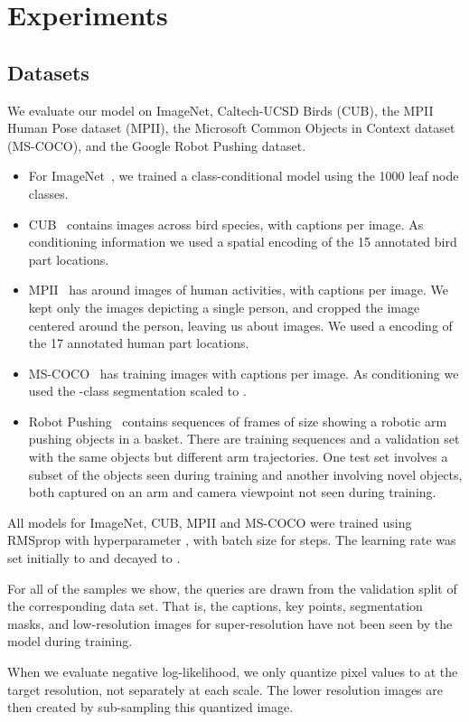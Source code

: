 \documentclass{article}
\begin{document}
\section{Experiments}
\label{sec:experiments}
\subsection{Datasets}
We evaluate our model on ImageNet, Caltech-UCSD Birds (CUB), the MPII Human Pose dataset (MPII), the Microsoft Common Objects in Context dataset (MS-COCO), and the Google Robot Pushing dataset.
\begin{itemize}
\item For ImageNet~\citep{deng2009imagenet}, we trained a class-conditional model using the 1000 leaf node classes.
\item CUB~\citep{wah2011caltech} contains  images across  bird species, with  captions
per image. As conditioning information we used a  spatial encoding of the 15 annotated bird part locations.
\item MPII~\citep{andriluka20142d} has around  images of 
human activities, with  captions per image.
We kept only the images depicting a single person, and cropped the image centered
around the person, leaving us about  images. We used a  encoding of the 17 annotated human part locations.
\item MS-COCO~\cite{lin2014microsoft} has  training images with  captions
per image. As conditioning we used the -class segmentation scaled to .
\item Robot Pushing~\cite{finn2016unsupervised}  contains sequences of  frames of size  showing a robotic arm pushing objects in a basket. There are  training sequences and a validation set with the same objects but different arm trajectories. One test set involves a subset of the objects seen during training and another involving novel objects, both captured on an arm and camera viewpoint not seen during training.
\end{itemize}
All models for ImageNet, CUB, MPII and MS-COCO were trained using RMSprop with hyperparameter 
, with batch size  for  steps.
The learning rate was set initially to  and decayed to .


For all of the samples we show, the queries are drawn from the validation split of the corresponding data set.
That is, the captions, key points, segmentation masks, and low-resolution images for super-resolution have not been seen by the model during training.


When we evaluate negative log-likelihood, we only quantize pixel values to  at the target resolution, not separately at each scale.
The lower resolution images are then created by sub-sampling this quantized image.
\end{document}
